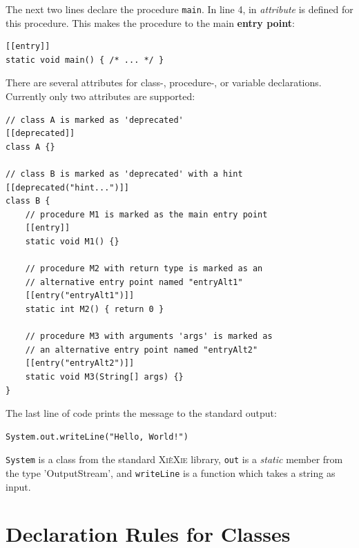 \documentclass{report}
\def\xiexie{\textsc{Xi\`eXie}\xspace}
\begin{document}
The next two lines declare the procedure \texttt{main}. In line 4, in \textit{attribute} is defined
for this procedure. This makes the procedure to the main \textbf{entry point}:
\begin{lstlisting}
[[entry]]
static void main() { /* ... */ }
\end{lstlisting}
There are several attributes for class-, procedure-, or variable declarations. Currently only two attributes are supported:
\begin{lstlisting}
// class A is marked as 'deprecated'
[[deprecated]]
class A {}

// class B is marked as 'deprecated' with a hint
[[deprecated("hint...")]]
class B {
    // procedure M1 is marked as the main entry point
    [[entry]]
    static void M1() {}
    
    // procedure M2 with return type is marked as an
    // alternative entry point named "entryAlt1"
    [[entry("entryAlt1")]]
    static int M2() { return 0 }
    
    // procedure M3 with arguments 'args' is marked as
    // an alternative entry point named "entryAlt2"
    [[entry("entryAlt2")]]
    static void M3(String[] args) {}
}
\end{lstlisting}

The last line of code prints the message to the standard output:
\begin{lstlisting}
System.out.writeLine("Hello, World!")
\end{lstlisting}
\texttt{System} is a class from the standard \xiexie library, \texttt{out} is a \textit{static} member
from the type 'OutputStream', and \texttt{writeLine} is a function which takes a string as input.



\section{Declaration Rules for Classes}
\end{document}
